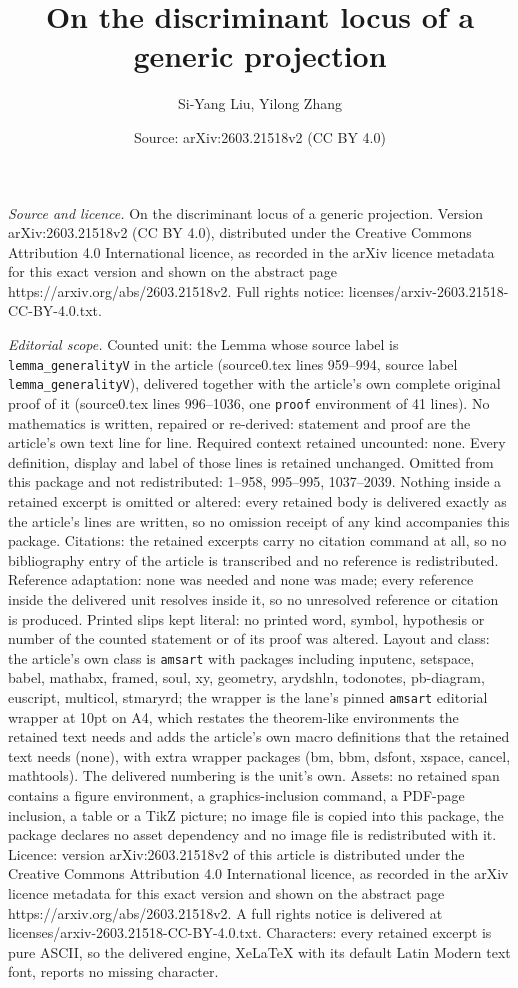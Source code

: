 \documentclass[10pt,a4paper]{amsart}
\title[On the discriminant locus of a generic projection]{On the discriminant locus of a generic projection}
\author{Si-Yang Liu, Yilong Zhang}
\date{Source: arXiv:2603.21518v2 (CC BY 4.0)}
\begin{document}
\maketitle

\noindent\emph{Source and licence.} On the discriminant locus of a generic projection. Version arXiv:2603.21518v2 (CC BY 4.0), distributed under the Creative Commons Attribution 4.0 International licence, as recorded in the arXiv licence metadata for this exact version and shown on the abstract page https://arxiv.org/abs/2603.21518v2. Full rights notice: licenses/arxiv-2603.21518-CC-BY-4.0.txt.\par\smallskip

\noindent\textit{Editorial scope.} Counted unit: the Lemma whose source label is \texttt{lemma\_generalityV} in the article (source0.tex lines 959--994, source label \texttt{lemma\_generalityV}), delivered together with the article's own complete original proof of it (source0.tex lines 996--1036, one \texttt{proof} environment of 41 lines). No mathematics is written, repaired or re-derived: statement and proof are the article's own text line for line. Required context retained uncounted: none. Every definition, display and label of those lines is retained unchanged. Omitted from this package and not redistributed: 1--958, 995--995, 1037--2039. Nothing inside a retained excerpt is omitted or altered: every retained body is delivered exactly as the article's lines are written, so no omission receipt of any kind accompanies this package. Citations: the retained excerpts carry no citation command at all, so no bibliography entry of the article is transcribed and no reference is redistributed. Reference adaptation: none was needed and none was made; every reference inside the delivered unit resolves inside it, so no unresolved reference or citation is produced. Printed slips kept literal: no printed word, symbol, hypothesis or number of the counted statement or of its proof was altered. Layout and class: the article's own class is \texttt{amsart} with packages including inputenc, setspace, babel, mathabx, framed, soul, xy, geometry, arydshln, todonotes, pb-diagram, euscript, multicol, stmaryrd; the wrapper is the lane's pinned \texttt{amsart} editorial wrapper at 10pt on A4, which restates the theorem-like environments the retained text needs and adds the article's own macro definitions that the retained text needs (none), with extra wrapper packages (bm, bbm, dsfont, xspace, cancel, mathtools). The delivered numbering is the unit's own. Assets: no retained span contains a figure environment, a graphics-inclusion command, a PDF-page inclusion, a table or a TikZ picture; no image file is copied into this package, the package declares no asset dependency and no image file is redistributed with it. Licence: version arXiv:2603.21518v2 of this article is distributed under the Creative Commons Attribution 4.0 International licence, as recorded in the arXiv licence metadata for this exact version and shown on the abstract page https://arxiv.org/abs/2603.21518v2. A full rights notice is delivered at licenses/arxiv-2603.21518-CC-BY-4.0.txt. Characters: every retained excerpt is pure ASCII, so the delivered engine, XeLaTeX with its default Latin Modern text font, reports no missing character.
\end{document}
